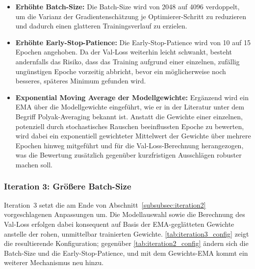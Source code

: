 \begin{itemize}
    \item \textbf{Erhöhte Batch-Size:} Die Batch-Size wird von 2048 auf 4096 verdoppelt, um die Varianz der Gradientenschätzung je Optimierer-Schritt zu reduzieren und dadurch einen glatteren Trainingsverlauf zu erzielen.
    \item \textbf{Erhöhte Early-Stop-Patience:} Die Early-Stop-Patience wird von 10 auf 15 Epochen angehoben. Da der Val-Loss weiterhin leicht schwankt, besteht andernfalls das Risiko, dass das Training aufgrund einer einzelnen, zufällig ungünstigen Epoche vorzeitig abbricht, bevor ein möglicherweise noch besseres, späteres Minimum gefunden wird.
    \item \textbf{Exponential Moving Average der Modellgewichte:} Ergänzend wird ein \gls{EMA} über die Modellgewichte eingeführt, wie er in der Literatur unter dem Begriff Polyak-Averaging bekannt ist. Anstatt die Gewichte einer einzelnen, potenziell durch stochastisches Rauschen beeinflussten Epoche zu bewerten, wird dabei ein exponentiell gewichteter Mittelwert der Gewichte über mehrere Epochen hinweg mitgeführt und für die Val-Loss-Berechnung herangezogen, was die Bewertung zusätzlich gegenüber kurzfristigen Ausschlägen robuster machen soll.
\end{itemize}

\subsubsection{Iteration 3: Größere Batch-Size}
\label{subsubsec:iteration3}

Iteration~3 setzt die am Ende von Abschnitt~\ref{subsubsec:iteration2} vorgeschlagenen Anpassungen um. Die Modellauswahl sowie die Berechnung des Val-Loss erfolgen dabei konsequent auf Basis der EMA-geglätteten Gewichte anstelle der rohen, unmittelbar trainierten Gewichte. \autoref{tab:iteration3_config} zeigt die resultierende Konfiguration; gegenüber \autoref{tab:iteration2_config} ändern sich die Batch-Size und die Early-Stop-Patience, und mit dem Gewichts-EMA kommt ein weiterer Mechanismus neu hinzu.


